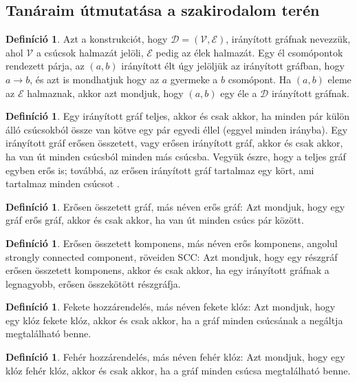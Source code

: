 \documentclass[
]{thesis-ekf}
\theoremstyle{definition}
\newtheorem{definicio}[tetel]{Definíció}
\theoremstyle{remark}
\begin{document}
\subsection{Tanáraim útmutatása a szakirodalom terén} \label{ssec-graf-alapok}
\begin{definicio}
	Azt a konstrukciót, hogy $\mathcal{D}=(\mathcal{V},\mathcal{E})$, irányított gráfnak nevezzük, ahol $ \mathcal{V} $ a csúcsok halmazát jelöli, $\mathcal{E}$ pedig az élek halmazát. Egy él csomópontok rendezett párja, az $(a,b)$ irányított élt úgy jelöljük az irányított gráfban, hogy $a \rightarrow b$, és azt is mondhatjuk hogy az $a$ gyermeke a $b$ csomópont. Ha $(a,b)$ eleme az $\mathcal{E}$ halmaznak, akkor azt mondjuk, hogy $(a,b)$ egy éle a $\mathcal{D}$ irányított gráfnak.
\end{definicio}
\begin{definicio}
	Egy irányított gráf teljes, akkor és csak akkor, ha minden pár külön álló csúcsokból össze van kötve egy pár egyedi éllel (eggyel minden irányba). Egy irányított gráf erősen összetett, vagy erősen irányított gráf, akkor és csak akkor, ha van út minden csúcsból minden más csúcsba. Vegyük észre, hogy a teljes gráf egyben erős is; továbbá, az erősen irányított gráf tartalmaz egy kört, ami tartalmaz minden csúcsot \cite{am}.
\end{definicio}

\begin{definicio}
	Erősen összetett gráf, más néven erős gráf: Azt mondjuk, hogy egy gráf erős gráf, akkor és csak akkor, ha van út minden csúcs pár között.
\end{definicio}
	
	\begin{definicio}
		Erősen összetett komponens, más néven erős komponens, angolul strongly connected component, röveiden \textsc{SCC}: Azt mondjuk, hogy egy részgráf erősen összetett komponens, akkor és csak akkor, ha egy irányított gráfnak a legnagyobb, erősen összekötött részgráfja.
	\end{definicio}
	
	\begin{definicio}
		Fekete hozzárendelés, más néven fekete klóz: Azt mondjuk, hogy egy klóz fekete klóz, akkor és csak akkor, ha a gráf minden csúcsának a negáltja megtalálható benne.
	\end{definicio}
	
	\begin{definicio}
		Fehér hozzárendelés, más néven fehér klóz: Azt mondjuk, hogy egy klóz fehér klóz, akkor és csak akkor, ha a gráf minden csúcsa megtalálható benne.
	\end{definicio}
\end{document}
